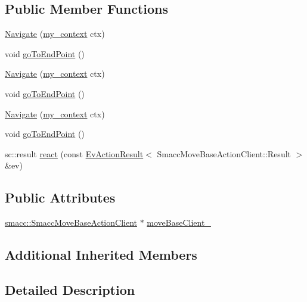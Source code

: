 \subsection*{Public Member Functions}
\begin{DoxyCompactItemize}
\item 
\hyperlink{structNavigate_a6be585a62dc40f453857b649017b4e82}{Navigate} (\hyperlink{common_8h_af2dcacead80d69b96952496fe413bbfe}{my\+\_\+context} ctx)
\item 
void \hyperlink{structNavigate_a941523c9ba8391d3775d6b7f62fe1261}{go\+To\+End\+Point} ()
\item 
\hyperlink{structNavigate_a6be585a62dc40f453857b649017b4e82}{Navigate} (\hyperlink{common_8h_af2dcacead80d69b96952496fe413bbfe}{my\+\_\+context} ctx)
\item 
void \hyperlink{structNavigate_a941523c9ba8391d3775d6b7f62fe1261}{go\+To\+End\+Point} ()
\item 
\hyperlink{structNavigate_a6be585a62dc40f453857b649017b4e82}{Navigate} (\hyperlink{common_8h_af2dcacead80d69b96952496fe413bbfe}{my\+\_\+context} ctx)
\item 
void \hyperlink{structNavigate_a941523c9ba8391d3775d6b7f62fe1261}{go\+To\+End\+Point} ()
\item 
sc\+::result \hyperlink{structNavigate_ac058d0da392b7c5e1873702820595ae4}{react} (const \hyperlink{structsmacc_1_1EvActionResult}{Ev\+Action\+Result}$<$ Smacc\+Move\+Base\+Action\+Client\+::\+Result $>$ \&ev)
\end{DoxyCompactItemize}
\subsection*{Public Attributes}
\begin{DoxyCompactItemize}
\item 
\hyperlink{classsmacc_1_1SmaccMoveBaseActionClient}{smacc\+::\+Smacc\+Move\+Base\+Action\+Client} $\ast$ \hyperlink{structNavigate_a6ccf129ef69c3a8f664ecb8c367dae86}{move\+Base\+Client\+\_\+}
\end{DoxyCompactItemize}
\subsection*{Additional Inherited Members}


\subsection{Detailed Description}


